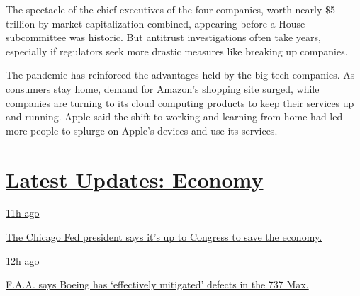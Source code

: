 The spectacle of the chief executives of the four companies, worth
nearly \$5 trillion by market capitalization combined, appearing before
a House subcommittee was historic. But antitrust investigations often
take years, especially if regulators seek more drastic measures like
breaking up companies.

The pandemic has reinforced the advantages held by the big tech
companies. As consumers stay home, demand for Amazon's shopping site
surged, while companies are turning to its cloud computing products to
keep their services up and running. Apple said the shift to working and
learning from home had led more people to splurge on Apple's devices and
use its services.

\hypertarget{latest-updates-economy}{%
\section{\texorpdfstring{\href{https://www.nytimes.com/live/2020/08/03/business/stock-market-today-coronavirus?action=click\&pgtype=Article\&state=default\&region=MAIN_CONTENT_1\&context=storylines_live_updates}{Latest
Updates:
Economy}}{Latest Updates: Economy}}\label{latest-updates-economy}}

\href{https://www.nytimes.com/live/2020/08/03/business/stock-market-today-coronavirus?action=click\&pgtype=Article\&state=default\&region=MAIN_CONTENT_1\&context=storylines_live_updates\#the-chicago-fed-president-says-its-up-to-congress-to-save-the-economy}{11h
ago}

\href{https://www.nytimes.com/live/2020/08/03/business/stock-market-today-coronavirus?action=click\&pgtype=Article\&state=default\&region=MAIN_CONTENT_1\&context=storylines_live_updates\#the-chicago-fed-president-says-its-up-to-congress-to-save-the-economy}{The
Chicago Fed president says it's up to Congress to save the economy.}

\href{https://www.nytimes.com/live/2020/08/03/business/stock-market-today-coronavirus?action=click\&pgtype=Article\&state=default\&region=MAIN_CONTENT_1\&context=storylines_live_updates\#faa-says-boeing-has-effectively-mitigated-defects-in-the-737-max}{12h
ago}

\href{https://www.nytimes.com/live/2020/08/03/business/stock-market-today-coronavirus?action=click\&pgtype=Article\&state=default\&region=MAIN_CONTENT_1\&context=storylines_live_updates\#faa-says-boeing-has-effectively-mitigated-defects-in-the-737-max}{F.A.A.
says Boeing has `effectively mitigated' defects in the 737 Max.}

